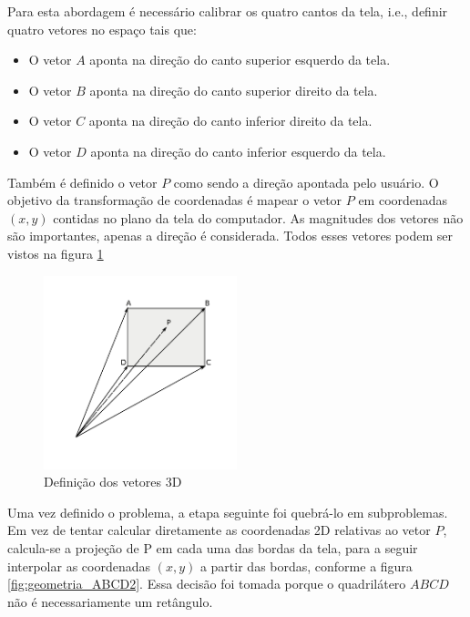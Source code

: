 \documentclass[brazil,pagestart=firstchapter]{abnt}
\makeatletter
\newcommand*{\ie}{i.e.\@\xspace}
\makeatother
\begin{document}
Para esta abordagem é necessário calibrar os quatro cantos da tela, \ie,
definir quatro vetores no espaço tais que:

\begin{itemize}
\item O vetor $A$ aponta na direção do canto superior esquerdo da tela.
\item O vetor $B$ aponta na direção do canto superior direito da tela.
\item O vetor $C$ aponta na direção do canto inferior direito da tela.
\item O vetor $D$ aponta na direção do canto inferior esquerdo da tela.
\end{itemize}

Também é definido o vetor $P$ como sendo a direção apontada pelo usuário. O
objetivo da transformação de coordenadas é mapear o vetor $P$ em coordenadas
$(x, y)$ contidas no plano da tela do computador. As magnitudes dos vetores
não são importantes, apenas a direção é considerada. Todos esses vetores
podem ser vistos na figura \ref{fig:geometria_ABCD1}

\begin{figure}[h]
\centering
\includegraphics[width=0.5\textwidth]{img/geometria_ABCD1.pdf}
\caption{Definição dos vetores 3D}
\label{fig:geometria_ABCD1}
\end{figure}

Uma vez definido o problema, a etapa seguinte foi quebrá-lo em subproblemas.
Em vez de tentar calcular diretamente as coordenadas 2D relativas ao vetor
$P$, calcula-se a projeção de P em cada uma das bordas da tela, para a
seguir interpolar as coordenadas $(x, y)$ a partir das bordas, conforme a
figura \ref{fig:geometria_ABCD2}. Essa decisão foi tomada porque o
quadrilátero $ABCD$ não é necessariamente um retângulo.
\end{document}
